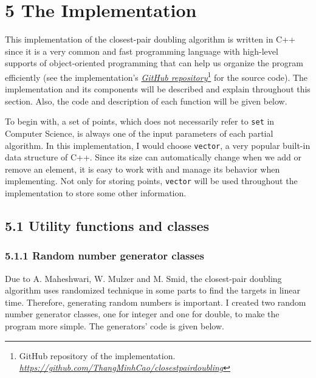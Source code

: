\documentclass[12pt,english,]{article}
\newcommand{\code}[1]{\colorbox{lbcolor}{\texttt{#1}}}
\begin{document}
\hypertarget{section5}{%
\section{\texorpdfstring{5 \enspace The
Implementation}{5 The Implementation}}\label{section5}}

This implementation of the closest-pair doubling algorithm is written in
C++ since it is a very common and fast programming language with
high-level supports of object-oriented programming that can help us
organize the program efficiently (see the implementation's
\href{https://github.com/ThangMinhCao/closestpairdoubling}{\emph{GitHub
repository}}\footnote{GitHub repository of the implementation.
  \href{https://github.com/ThangMinhCao/closestpairdoubling}{\emph{https://github.com/ThangMinhCao/closestpairdoubling}}}
for the source code). The implementation and its components will be
described and explain throughout this section. Also, the code and
description of each function will be given below.

To begin with, a set of points, which does not necessarily refer to
\code{set} in Computer Science, is always one of the input parameters of
each partial algorithm. In this implementation, I would choose
\code{vector}, a very popular built-in data structure of C++. Since its
size can automatically change when we add or remove an element, it is
easy to work with and manage its behavior when implementing. Not only
for storing points, \code{vector} will be used throughout the
implementation to store some other information.

\hypertarget{section5.1}{%
\subsection{5.1 Utility functions and classes}\label{section5.1}}

\hypertarget{section5.1.1}{%
\subsubsection{5.1.1 Random number generator
classes}\label{section5.1.1}}

Due to A. Maheshwari, W. Mulzer and M. Smid, the closest-pair doubling
algorithm uses randomized technique in some parts to find the targets in
linear time. Therefore, generating random numbers is important. I
created two random number generator classes, one for integer and one for
double, to make the program more simple. The generators' code is given
below.
\end{document}
